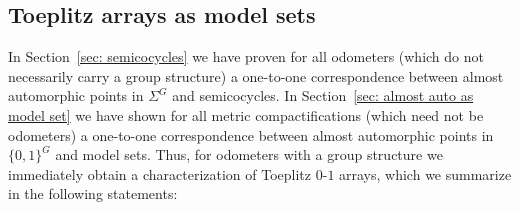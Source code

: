 \documentclass[titlepage,reqno,10pt]{amsart}
\newtheorem{corollary}[theorem]{Corollary}
\theoremstyle{definition}
\begin{document}
\subsection{Toeplitz arrays as model sets}\label{sec: Toeplitz as model set}
In Section~\ref{sec: semicocycles} we have proven for all odometers (which do not necessarily carry a group structure) a one-to-one correspondence between almost automorphic points in $\Sigma^G$ and semicocycles.
In Section~\ref{sec: almost auto as model set} we have shown for all metric compactifications (which need not be odometers) a one-to-one correspondence between almost automorphic points in $\{0,1\}^G$ and model sets.
Thus, for odometers with a group structure we immediately obtain a characterization of Toeplitz $0$-$1$ arrays, which we summarize in the following statements:

    



\end{document}

